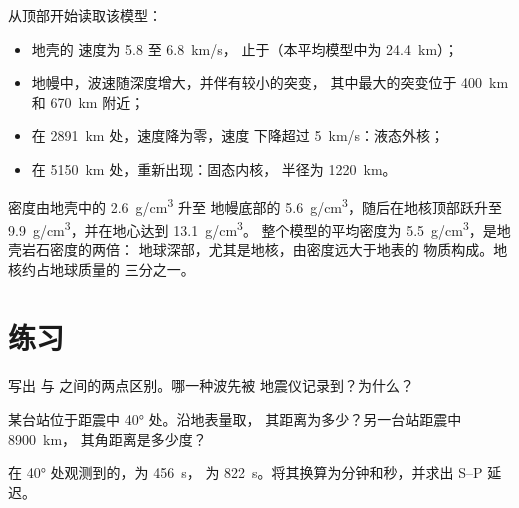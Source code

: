 从顶部开始读取该模型：
\begin{itemize}
  \item 地壳的 速度为 5.8 至 \qty{6.8}{km/s}，
        止于（本平均模型中为 \qty{24.4}{km}）；
  \item 地幔中，波速随深度增大，并伴有较小的突变，
        其中最大的突变位于 \qty{400}{km} 和 \qty{670}{km} 附近；
  \item 在 \qty{2891}{km} 处，速度降为零，速度
        下降超过 \qty{5}{km/s}：液态外核；
  \item 在 \qty{5150}{km} 处，重新出现：固态内核，
        半径为 \qty{1220}{km}。
\end{itemize}

密度由地壳中的 \qty{2.6}{g/cm^3} 升至
地幔底部的 \qty{5.6}{g/cm^3}，随后在地核顶部跃升至
\qty{9.9}{g/cm^3}，并在地心达到 \qty{13.1}{g/cm^3}。
整个模型的平均密度为 \qty{5.5}{g/cm^3}，是地壳岩石密度的两倍：
地球深部，尤其是地核，由密度远大于地表的
物质构成。地核约占地球质量的
三分之一。

\section{练习}

\begin{exercise}[$\star$]\label{exo:g11:seismic-structure:1}
写出 与 之间的两点区别。哪一种波先被
地震仪记录到？为什么？
\end{exercise}

\begin{exercise}[$\star$]\label{exo:g11:seismic-structure:2}
某台站位于距震中 \ang{40} 处。沿地表量取，
其距离为多少？另一台站距震中 \qty{8900}{km}，
其角距离是多少度？
\end{exercise}

\begin{exercise}[$\star$]\label{exo:g11:seismic-structure:3}
在 \ang{40} 处观测到的，为 \qty{456}{s}，
为 \qty{822}{s}。将其换算为分钟和秒，并求出 S--P
延迟。
\end{exercise}

